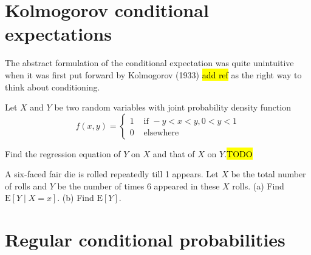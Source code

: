\section{Kolmogorov conditional expectations}

The abstract formulation of the conditional expectation was quite
unintuitive when it was first put forward by Kolmogorov (1933) \hl{add ref}
as the right way to think about conditioning.
\begin{example}
\label{exa:isi2005samplepsb11}Let $X$ and $Y$ be two random variables
with joint probability density function 
\[
f(x,y)=\begin{cases}
1 & \text{ if }-y<x<y,0<y<1\\
0 & \text{ elsewhere }
\end{cases}
\]

Find the regression equation of $Y$ on $X$ and that of $X$ on $Y$.\hl{TODO}
\end{example}

\begin{example}
	\label{exa:isi2023psb4}
	A six-faced fair die is rolled repeatedly till 1 appears. Let $X$ be the total number of rolls and $Y$ be the number of times 6 appeared in these $X$ rolls.
	(a) Find $\mathrm{E}[Y \mid X=x]$.
	(b) Find $\mathrm{E}[Y]$.
	
\end{example}


\section{Regular conditional probabilities}
